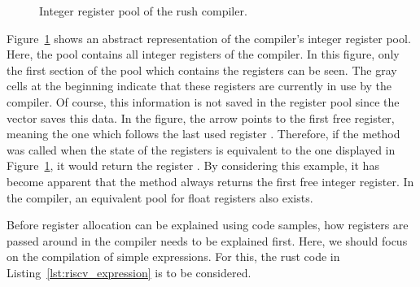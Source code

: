 \begin{figure}
	\centering
	\caption{Integer register pool of the \riscv{} rush compiler.}\label{fig:riscv_iregister_pool}
\end{figure}

Figure~\ref{fig:riscv_iregister_pool} shows an abstract representation of the compiler's integer register pool.
Here, the pool contains all integer registers of the compiler.
In this figure, only the first section of the pool which contains the  registers can be seen.
The gray cells at the beginning indicate that these registers are currently in use by the compiler.
Of course, this information is not saved in the register pool since the  vector saves this data.
In the figure, the arrow points to the first free register, meaning the one which follows the last used register .
Therefore, if the  method was called when the state of the registers is equivalent to the one displayed in Figure~\ref{fig:riscv_iregister_pool}, it would return the register .
By considering this example, it has become apparent that the method always returns the first free integer register.
In the compiler, an equivalent pool for float registers also exists.

Before register allocation can be explained using code samples, how registers are passed around in the compiler needs to be explained first.
Here, we should focus on the compilation of simple expressions.
For this, the rust code in Listing~\ref{lst:riscv_expression} is to be considered.

